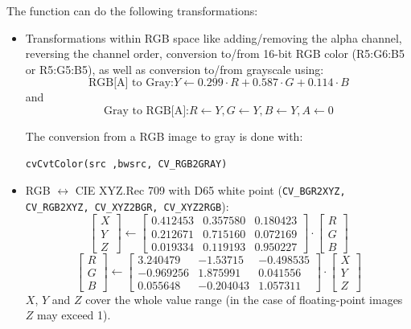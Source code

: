 The function can do the following transformations:

\begin{itemize}
 \item Transformations within RGB space like adding/removing the alpha channel, reversing the channel order, conversion to/from 16-bit RGB color (R5:G6:B5 or R5:G5:B5), as well as conversion to/from grayscale using:
 \[
 \text{RGB[A] to Gray:} Y \leftarrow 0.299 \cdot R + 0.587 \cdot G + 0.114 \cdot B
 \]
 and
 \[
 \text{Gray to RGB[A]:} R \leftarrow Y, G \leftarrow Y, B \leftarrow Y, A \leftarrow 0
 \]

The conversion from a RGB image to gray is done with:
\begin{lstlisting}
cvCvtColor(src ,bwsrc, CV_RGB2GRAY)
\end{lstlisting}

 \item RGB $\leftrightarrow$ CIE XYZ.Rec 709 with D65 white point (\texttt{CV\_BGR2XYZ, CV\_RGB2XYZ, CV\_XYZ2BGR, CV\_XYZ2RGB}):
 \[
 \begin{bmatrix}
 X \\
 Y \\
 Z
 \end{bmatrix}
 \leftarrow
 \begin{bmatrix}
0.412453 & 0.357580 & 0.180423\\
0.212671 & 0.715160 & 0.072169\\
0.019334 & 0.119193 & 0.950227
 \end{bmatrix}
 \cdot
 \begin{bmatrix}
 R \\
 G \\
 B
 \end{bmatrix}
 \]
 \[
 \begin{bmatrix}
 R \\
 G \\
 B
 \end{bmatrix}
 \leftarrow
 \begin{bmatrix}
3.240479 & -1.53715 & -0.498535\\
-0.969256 &  1.875991 & 0.041556\\
0.055648 & -0.204043 & 1.057311
 \end{bmatrix}
 \cdot
 \begin{bmatrix}
 X \\
 Y \\
 Z
 \end{bmatrix}
 \]
$X$, $Y$ and $Z$ cover the whole value range (in the case of floating-point images $Z$ may exceed 1).


\end{itemize}
